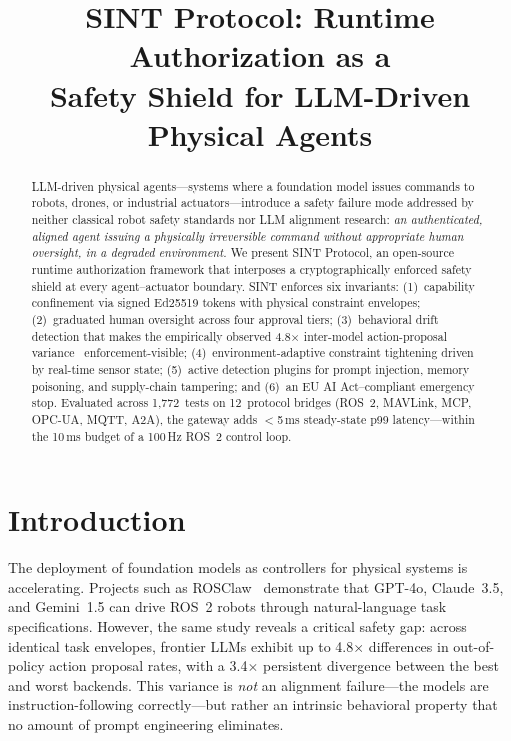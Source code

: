 \documentclass[conference]{IEEEtran}
\begin{document}
\title{SINT Protocol: Runtime Authorization as a\\Safety Shield for LLM-Driven Physical Agents}

\author{
}

\maketitle

\begin{abstract}
LLM-driven physical agents---systems where a foundation model issues commands to
robots, drones, or industrial actuators---introduce a safety failure mode
addressed by neither classical robot safety standards nor LLM alignment research:
\emph{an authenticated, aligned agent issuing a physically irreversible command
without appropriate human oversight, in a degraded environment.}
We present SINT Protocol, an open-source runtime authorization framework that
interposes a cryptographically enforced safety shield at every agent--actuator
boundary.
SINT enforces six invariants: (1)~capability confinement via signed Ed25519
tokens with physical constraint envelopes; (2)~graduated human oversight across
four approval tiers; (3)~behavioral drift detection that makes the empirically
observed 4.8$\times$ inter-model action-proposal variance~\cite{rosclaw}
enforcement-visible; (4)~environment-adaptive constraint tightening driven by
real-time sensor state; (5)~active detection plugins for prompt injection,
memory poisoning, and supply-chain tampering; and (6)~an EU AI Act--compliant
emergency stop.
Evaluated across 1,772~tests on 12~protocol bridges (ROS~2, MAVLink, MCP, OPC-UA,
MQTT, A2A), the gateway adds $<$5\,ms steady-state p99 latency---within the
10\,ms budget of a 100\,Hz ROS~2 control loop.
\end{abstract}

\section{Introduction}
\label{sec:intro}

The deployment of foundation models as controllers for physical systems is
accelerating.
Projects such as ROSClaw~\cite{rosclaw} demonstrate that GPT-4o, Claude~3.5, and
Gemini~1.5 can drive ROS~2 robots through natural-language task specifications.
However, the same study reveals a critical safety gap: across identical task
envelopes, frontier LLMs exhibit up to 4.8$\times$ differences in out-of-policy
action proposal rates, with a 3.4$\times$ persistent divergence between the best
and worst backends.
This variance is \emph{not} an alignment failure---the models are instruction-following
correctly---but rather an intrinsic behavioral property that no amount of prompt
engineering eliminates.
\end{document}
